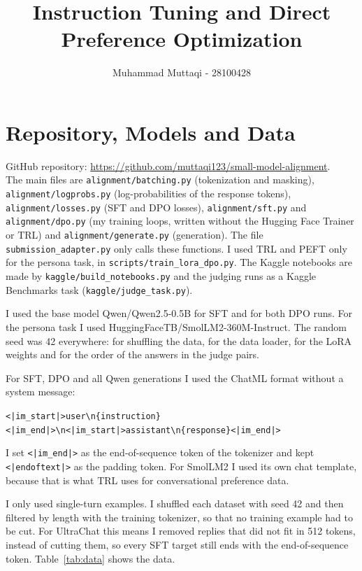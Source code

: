 \documentclass[11pt,a4paper]{article}
\title{Instruction Tuning and Direct Preference Optimization}
\author{Muhammad Muttaqi - 28100428}
\date{}
\begin{document}
\maketitle

\section{Repository, Models and Data}

GitHub repository: \url{https://github.com/muttaqi123/small-model-alignment}.\\ The main files are
\texttt{alignment/batching.py} (tokenization and masking), \texttt{alignment/logprobs.py} (log-probabilities of the response tokens),
\texttt{alignment/losses.py} (SFT and DPO losses), \texttt{alignment/sft.py} and \texttt{alignment/dpo.py} (my training loops, written
without the Hugging Face Trainer or TRL) and \texttt{alignment/generate.py} (generation). The file \texttt{submission\_adapter.py} only calls
these functions. I used TRL and PEFT only for the persona task, in \texttt{scripts/train\_lora\_dpo.py}. The Kaggle notebooks are made by
\texttt{kaggle/build\_notebooks.py} and the judging runs as a Kaggle Benchmarks task (\texttt{kaggle/judge\_task.py}).

I used the base model Qwen/Qwen2.5-0.5B for SFT and for both DPO runs. For the persona task I used HuggingFaceTB/SmolLM2-360M-Instruct. The
random seed was 42 everywhere: for shuffling the data, for the data loader, for the LoRA weights and for the order of the answers in the judge
pairs.

For SFT, DPO and all Qwen generations I used the ChatML format without a system message:
\begin{center}
\scriptsize\texttt{<|im\_start|>user\textbackslash n\{instruction\}<|im\_end|>\textbackslash n<|im\_start|>assistant\textbackslash n\{response\}<|im\_end|>}
\end{center}
I set \texttt{<|im\_end|>} as the end-of-sequence token of the tokenizer and kept \texttt{<|endoftext|>} as the padding token. For SmolLM2 I
used its own chat template, because that is what TRL uses for conversational preference data.

I only used single-turn examples. I shuffled each dataset with seed 42 and then filtered by length with the training tokenizer, so that no
training example had to be cut. For UltraChat this means I removed replies that did not fit in 512 tokens, instead of cutting them, so every
SFT target still ends with the end-of-sequence token. Table~\ref{tab:data} shows the data.
\end{document}
